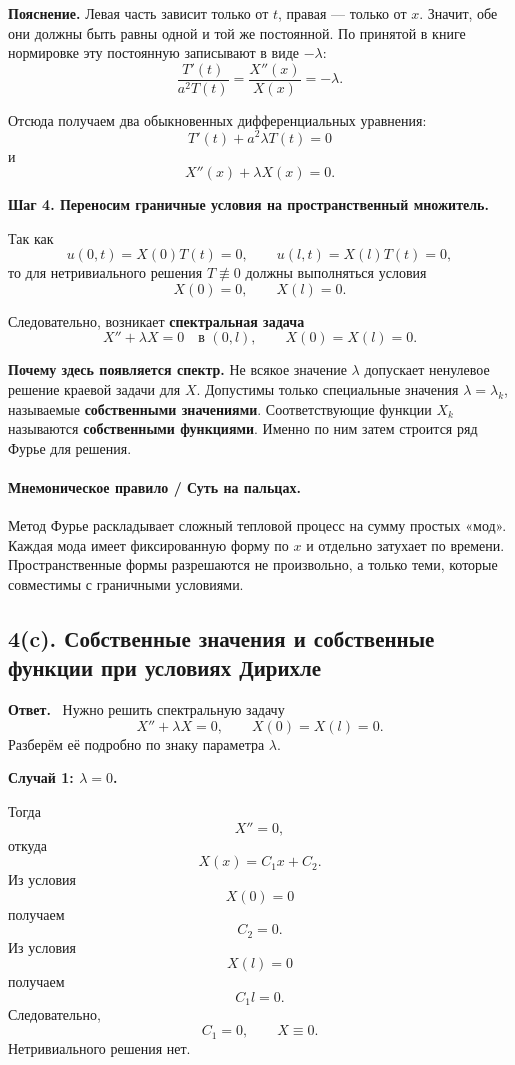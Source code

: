 \documentclass[a4paper,12pt]{article}
\newcommand{\Answer}{\textbf{Ответ.}\ }
\begin{document}
\textbf{Пояснение.} Левая часть зависит только от $t$, правая --- только от $x$. Значит, обе они должны быть равны одной и той же постоянной. По принятой в книге нормировке эту постоянную записывают в виде $-\lambda$:
\[
\frac{T'(t)}{a^2T(t)}=\frac{X''(x)}{X(x)}=-\lambda.
\]

Отсюда получаем два обыкновенных дифференциальных уравнения:
\[
T'(t)+a^2\lambda T(t)=0
\]
и
\[
X''(x)+\lambda X(x)=0.
\]

\textbf{Шаг 4. Переносим граничные условия на пространственный множитель.}

Так как
\[
u(0,t)=X(0)T(t)=0,
\qquad
u(l,t)=X(l)T(t)=0,
\]
то для нетривиального решения $T\not\equiv 0$ должны выполняться условия
\[
X(0)=0,
\qquad
X(l)=0.
\]

Следовательно, возникает \textbf{спектральная задача}
\[
X''+\lambda X=0
\quad \text{в } (0,l),
\qquad
X(0)=X(l)=0.
\]

\textbf{Почему здесь появляется спектр.}
Не всякое значение $\lambda$ допускает ненулевое решение краевой задачи для $X$. Допустимы только специальные значения $\lambda=\lambda_k$, называемые \textbf{собственными значениями}. Соответствующие функции $X_k$ называются \textbf{собственными функциями}. Именно по ним затем строится ряд Фурье для решения.

\paragraph{Мнемоническое правило / Суть на пальцах.}
Метод Фурье раскладывает сложный тепловой процесс на сумму простых «мод».
Каждая мода имеет фиксированную форму по $x$ и отдельно затухает по времени.
Пространственные формы разрешаются не произвольно, а только теми, которые совместимы с граничными условиями.

\subsection*{4(c). Собственные значения и собственные функции при условиях Дирихле}

\Answer
Нужно решить спектральную задачу
\[
X''+\lambda X=0,
\qquad
X(0)=X(l)=0.
\]
Разберём её подробно по знаку параметра $\lambda$.

\textbf{Случай 1: \texorpdfstring{$\lambda=0$}{lambda=0}.}

Тогда
\[
X''=0,
\]
откуда
\[
X(x)=C_1x+C_2.
\]
Из условия
\[
X(0)=0
\]
получаем
\[
C_2=0.
\]
Из условия
\[
X(l)=0
\]
получаем
\[
C_1l=0.
\]
Следовательно,
\[
C_1=0,
\qquad X\equiv 0.
\]
Нетривиального решения нет.
\end{document}
